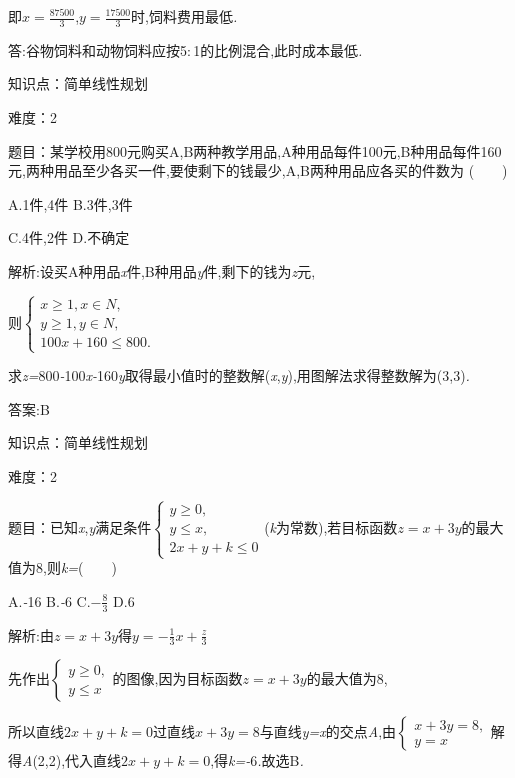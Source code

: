 \documentclass{article} %
\begin{document}
即$x=\frac{87500}{3}$,$y=\frac{17500}{3}$时,饲料费用最低\textit{.}

答:谷物饲料和动物饲料应按5\textit{$:$}1的比例混合,此时成本最低\textit{.}


知识点：简单线性规划

难度：2

题目：某学校用800元购买A,B两种教学用品,A种用品每件100元,B种用品每件160元,两种用品至少各买一件,要使剩下的钱最少,A,B两种用品应各买的件数为 (\textit{　　})

 

 A.1件,4件 B.3件,3件

 C.4件,2件 D.不确定

 解析:设买A种用品\textit{x}件,B种用品\textit{y}件,剩下的钱为\textit{z}元,

则$
\begin{cases}
x\ge 1, x\in N,\\
y \ge 1, y \in N,\\
100x + 160 \le 800.
\end{cases}$

求\textit{z=}800\textit{-}100\textit{x-}160\textit{y}取得最小值时的整数解(\textit{x},\textit{y}),用图解法求得整数解为(3,3)\textit{.}

 答案:B


知识点：简单线性规划

难度：2

题目：已知\textit{x},\textit{y}满足条件$
\begin{cases}
y \ge 0,\\
y \le x,\\
2x + y +k \le 0
\end{cases}$(\textit{k}为常数),若目标函数$z=x+3y$的最大值为8,则\textit{k=}(\textit{　　})

 A.\textit{-}16 B.\textit{-}6 C.$-\frac{8}{3}$ D.6

 解析:由$z=x+3y$得$y=-\frac{1}{3}x+\frac{z}{3}$

先作出$
\begin{cases}
y \ge 0,\\
y \le x
\end{cases}$的图像,因为目标函数$z=x+3y$的最大值为8,

所以直线$2x+y+k=0$过直线$x+3y=8$与直线\textit{y=x}的交点\textit{A},由$
\begin{cases}
x+3y=8,\\
y=x
\end{cases}$解得\textit{A}(2,2),代入直线$2x+y+k=0$,得\textit{k=-}6\textit{.}故选B\textit{.}
\end{document}

